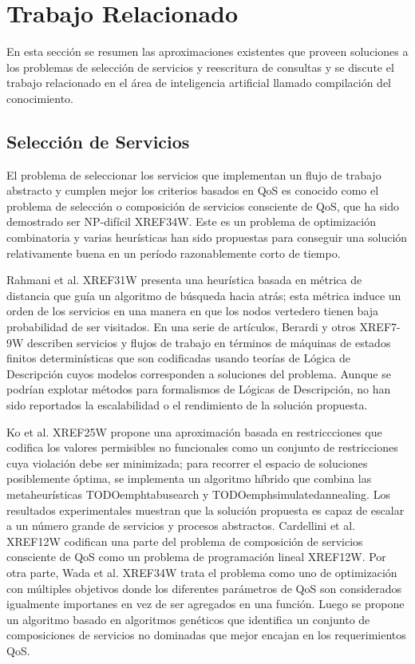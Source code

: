 \documentclass{article}
\begin{document}
\tableofcontents

\section{Trabajo Relacionado}

En esta sección se resumen las aproximaciones existentes que proveen soluciones
a los problemas de selección de servicios y reescritura de consultas y se
discute el trabajo relacionado en el área de inteligencia artificial llamado
compilación del conocimiento.

\subsection{Selección de Servicios}

El problema de seleccionar los servicios que implementan un flujo de trabajo
abstracto y cumplen mejor los criterios basados en QoS es conocido como el
problema de selección o composición de servicios consciente de QoS, que ha sido
demostrado ser NP-difícil XREF34W. Este es un problema de optimización
combinatoria y varias heurísticas han sido propuestas para conseguir una
solución relativamente buena en un período razonablemente corto de tiempo.

Rahmani et al. XREF31W presenta una heurística basada en métrica de distancia
que guía un algoritmo de búsqueda hacia atrás; esta métrica induce un orden de
los servicios en una manera en que los nodos vertedero tienen baja probabilidad
de ser visitados. En una serie de artículos, Berardi y otros XREF7-9W describen
servicios y flujos de trabajo en términos de máquinas de estados finitos
determinísticas que son codificadas usando teorías de Lógica de Descripción
cuyos modelos corresponden a soluciones del problema. Aunque se podrían explotar
métodos para formalismos de Lógicas de Descripción, no han sido reportados la
escalabilidad o el rendimiento de la solución propuesta.

Ko et al. XREF25W propone una aproximación basada en restriccciones que codifica
los valores permisibles no funcionales como un conjunto de restricciones cuya
violación debe ser minimizada; para recorrer el espacio de soluciones
posiblemente óptima, se implementa un algoritmo híbrido que combina las
metaheurísticas TODOemphtabusearch y TODOemphsimulatedannealing. Los resultados
experimentales muestran que la solución propuesta es capaz de escalar a un
número grande de servicios y procesos abstractos. Cardellini et al. XREF12W
codifican una parte del problema de composición de servicios consciente de QoS
como un problema de programación lineal XREF12W. Por otra parte, Wada et al.
XREF34W trata el problema como uno de optimización con múltiples objetivos donde
los diferentes parámetros de QoS son considerados igualmente importanes en vez
de ser agregados en una función. Luego se propone un algoritmo basado en
algoritmos genéticos que identifica un conjunto de composiciones de servicios
no dominadas que mejor encajan en los requerimientos QoS.
\end{document}
